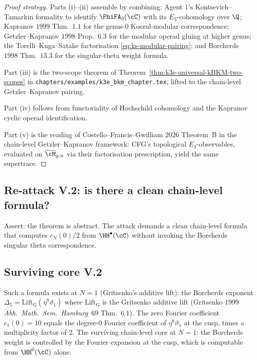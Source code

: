 \begin{proof}[Proof strategy]
Parts (i)--(ii) assemble by combining: Agent $1$'s Kontsevich--Tamarkin
formality to identify $\PhiFA_3(\cC)$ with its $E_3$-cohomology over
$\Q$; Kapranov $1999$ Thm.~$1.1$ for the genus-$0$ Koszul-modular
correspondence; Getzler--Kapranov $1998$ Prop.~$6.3$ for the modular
operad gluing at higher genus; the Torelli--Kuga--Satake factorisation
\eqref{eq:ks-modular-pairing}; and Borcherds $1998$ Thm.~$13.3$ for the
singular-theta weight formula.

Part (iii) is the two-scope theorem of
Theorem~\ref{thm:k3e-universal-kBKM-two-scopes} in
\texttt{chapters/examples/k3e\_bkm\_chapter.tex}, lifted to the
chain-level Getzler--Kapranov pairing.

Part (iv) follows from functoriality of Hochschild cohomology and the
Kapranov cyclic operad identification.

Part (v) is the reading of Costello--Francis--Gwilliam $2026$ Theorem~B
in the chain-level Getzler--Kapranov framework: CFG's topological
$E_3$-observables, evaluated on $\overline{\cM}_{g, n}$ via their factorisation
prescription, yield the same supertrace.
\end{proof}

\subsection*{Re-attack V.2: is there a clean chain-level formula?}

Assert: the theorem is abstract. The attack demands a clean chain-level
formula that computes $c_N(0)/2$ from $\HH^\bullet(\cC)$ without invoking
the Borcherds singular theta correspondence.

\subsection*{Surviving core V.2}

Such a formula exists at $N = 1$ (Gritsenko's additive lift): the
Borcherds exponent $\Delta_5 = \mathrm{Lift}_{\mathrm{G}}(\eta^9 \vartheta_1)$
where $\mathrm{Lift}_{\mathrm{G}}$ is the Gritsenko additive lift
(Gritsenko $1999$ \emph{Abh.~Math.~Sem.~Hamburg}\ $69$ Thm.~$6.1$). The
zero Fourier coefficient $c_1(0) = 10$ equals the degree-$0$ Fourier
coefficient of $\eta^9 \vartheta_1$ at the cusp, times a multiplicity
factor of $2$. The surviving chain-level core at $N = 1$: the Borcherds
weight is controlled by the Fourier expansion at the cusp, which is
computable from $\HH^0(\cC)$ alone.

